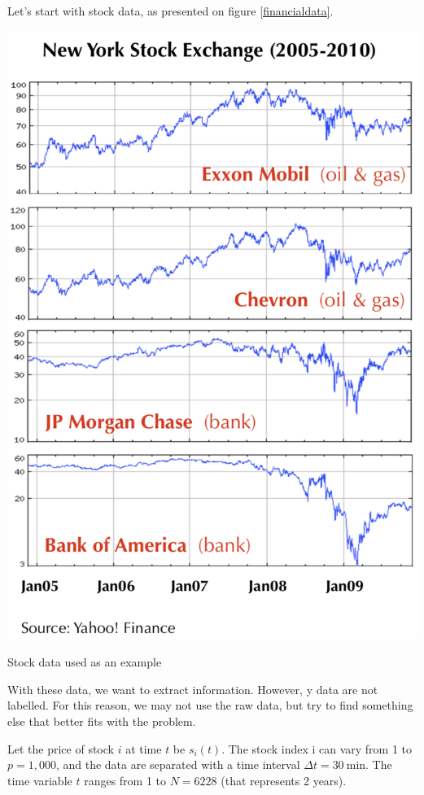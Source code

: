 \documentclass[a4paper]{tufte-book}
\begin{document}
Let's start with stock data, as presented on figure \ref{financialdata}.

\begin{marginfigure}
    \includegraphics{./Figures/stock.png}
    \caption{Stock data used as an example}
    \label{financialdata}
\end{marginfigure}

With these data, we want to extract information. However, y data are not
labelled. For this reason, we may not use the raw data, but try to find
something else that better fits with the problem.

Let the price of stock $i$ at time $t$ be $s_i(t)$. The stock index i can vary
from 1 to $p=1,000$, and the data are separated with a time interval 
$\Delta t = \SI{30}{\minute}$. The time variable $t$ ranges from 1 to $N=6228$
(that represents 2 years).
\end{document}
